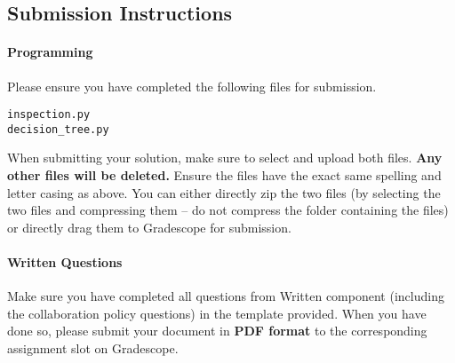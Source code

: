 \documentclass[11pt,addpoints,answers]{exam}
\begin{document}
\begin{comment}
    \begin{itemize}
    \item \texttt{Attribute:buying('expensive'or'cheap')}
    \item \texttt{Attribute:maint('high'or'low')}
    \item \texttt{Attribute:doors('Two'or'MoreThanTwo')}
    \item \texttt{Attribute:length('morethan3min'or'lessthan3min')}
    \item \texttt{Attribute:person('Two'or'MoreThanTwo')}
    \item \texttt{Attribute:boot('large'or'small')}
    \item \texttt{Attribute:safety('high'or'low')}
    \item \texttt{Class Label:class('yes'or'no')}
    \end{itemize}
    
    Please ensure your solution can handle data with these values.
 
\end{comment}
    
\subsection{Submission Instructions}

\paragraph{Programming}
Please ensure you have completed the following files for submission.


\begin{verbatim}
inspection.py
decision_tree.py
\end{verbatim}

When submitting your solution, make sure to select and upload both files. \textbf{Any other files will be deleted.} Ensure the files have the exact same spelling and letter casing as above. You can either directly zip the two files (by selecting the two files and compressing them -- do not compress the folder containing the files) or directly drag them to Gradescope for submission.


\paragraph{Written Questions}
Make sure you have completed all questions from Written component (including the collaboration policy questions) in the template provided.  When you have done so, please submit your document in \textbf{PDF format} to the corresponding assignment slot on Gradescope.



\newpage
\end{document}
